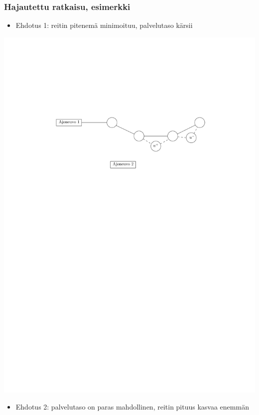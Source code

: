 \documentclass{beamer}
\begin{document}
%   
%   
  \begin{frame}
  \frametitle{Hajautettu ratkaisu, esimerkki}   %
  \begin{itemize}
 \item
 Ehdotus 1: reitin pitenemä minimoituu, palvelutaso kärsii
 \end{itemize}
 
    \begin{minipage}{\textwidth}
    \centering
\includegraphics[scale=0.5]{valinta03}
  \end{minipage}
\begin{itemize}
  \item
 Ehdotus 2: palvelutaso on paras mahdollinen, reitin pituus kasvaa enemmän
\end{itemize}


\end{frame}
\end{document}
